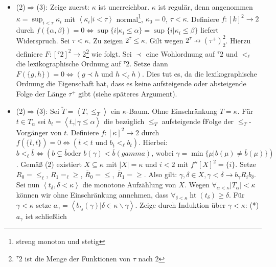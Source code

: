 \documentclass[a4paper,fontsize=11pt]{scrartcl}
\newcommand{\height}{\operatorname{ht}}
\begin{document}
\begin{itemize}
    \item (2)$\Rightarrow$(3): Zeige zuerst: $\kappa$ ist
      unerreichbar. $\kappa$ ist regulär, denn angenommen
      $\kappa=\sup_{i<\tau}\kappa_i$ mit
      $\left<\kappa_i|i<\tau\right>$ normal\footnote{streng monoton
        und stetig}, $\kappa_0=0$, $\tau<\kappa$. Definiere
      $f:[k]^2\rightarrow 2$ durch $f(\{\alpha,\beta\})=0
      \Leftrightarrow\sup\{i|\kappa_i\le\alpha\}=
      \sup\{i|\kappa_i\le\beta\}$ liefert Widerspruch. \newline Sei
      $\tau<\kappa$. Zu zeigen $2^\tau\le\kappa$. Gilt wegen
      $2^\tau\not\rightarrow(\tau^+)_2^2$. Hierzu definiere $F:[^\tau
        2]^2\rightarrow 2$\footnote{$^\tau 2$ ist die Menge der
        Funktionen von $\tau$ nach $2$} wie folgt. Sei $\prec$ eine
      Wohlordnung auf $^\tau 2$ und $<_\ell$ die lexikographische
      Ordnung auf $^\tau 2$. Setze dann
      $F(\{g,h\})=0\Leftrightarrow(g\prec h\mbox{ und }h<_\ell
      h)$. Dies tut es, da die lexikographische Ordnung die
      Eigenschaft hat, dass es keine aufsteigende oder absteigende
      Folge der Länge $\tau^+$ gibt (siehe späteres Argument).
    \item (2)$\Rightarrow$(3): Sei $\utilde{T}=\left<T,\le_T\right>$
      ein $\kappa$-Baum. Ohne Einschränkung $T=\kappa$. Für $t\in
      T_\alpha$ sei $b_t=\left<t_\gamma|\gamma\le\alpha\right>$ die
      bezüglich $\le_T$ aufsteigende fFolge der $\le_T$-Vorgänger von
      $t$. Definiere $f:[\kappa]^2\rightarrow 2$ durch
      $f(\{\overline{t},t\})=0\Leftrightarrow(\overline{t}<t\mbox{ und
      }b_{\overline{t}}<_\ell b_t)$. Hierbei:
      $b<_\ell\overline{b}\Leftrightarrow(b\subsetneq\overline{b}\mbox{
        oder }b(\gamma)<\overline{b}(gamma)\mbox{, wobei
      }\gamma=\min\{\mu|b(\mu)\neq\overline{b}(\mu)\})$. Gemäß (2)
      existiert $X\subseteq\kappa$ mit $|X|=\kappa$ und $i<2$ mit
      $f''[X]^2=\{i\}$. Setze $R_0=\le_\ell$, $R_1=_\ell\ge$,
      $\overline{R}_0=\le$, $\overline{R}_1=\ge$. Also gilt:
      $\gamma,\delta\in X,\gamma<\delta\rightarrow b_\gamma R_i
      b_\delta$. Sei nun $\left<t_\delta,\delta<\kappa\right>$ die
      monotone Aufzählung von $X$. Wegen $\forall_{\alpha<\kappa}
      |T_\alpha|<\kappa$ können wir ohne Einschränkung annehmen, dass
      $\forall_{\delta<\kappa}\height(t_\delta)\ge\delta$. Für
      $\gamma<\kappa$ setze $a_\gamma= \left<b_{t_\delta}(\gamma)|
      \delta\in\kappa\backslash\gamma\right>$. Zeige durch Induktion
      über $\gamma<\kappa$: \newline (*) $a_\gamma$ ist schließlich

\end{itemize}
\end{document}
